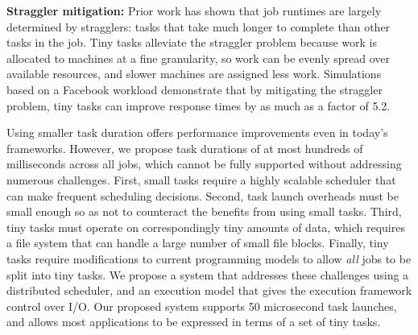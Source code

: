 \noindent\textbf{Straggler mitigation:}
Prior work has shown that job runtimes are largely determined by
stragglers: tasks that take much longer to complete than other tasks in the
job.
Tiny tasks alleviate the straggler problem because work is allocated to
machines at a fine granularity, so work can be evenly spread
over available resources, and slower machines are assigned
less work. Simulations based on a Facebook workload
demonstrate that by mitigating the straggler problem, tiny tasks
can improve response times by as much as a factor of 5.2.


Using smaller task duration offers performance improvements even in
today's frameworks.  However, we propose task durations of at most
hundreds of milliseconds across all jobs, which cannot be fully supported without addressing
numerous challenges. First, small tasks require a highly scalable scheduler
that can make frequent scheduling decisions. Second,
task launch overheads must be small enough so as not to counteract the
benefits from using small tasks.
Third, tiny tasks must operate on correspondingly tiny amounts
of data, which requires a file system that can handle a large number of 
small file blocks. Finally, tiny tasks require modifications to current programming
models to allow \emph{all} jobs to be split into tiny tasks. We propose a system
that addresses these challenges using a distributed scheduler, and an execution model that gives the execution framework control
over I/O. Our proposed system supports
50 microsecond task launches, and allows most applications to be
expressed in terms of a set of tiny tasks.


